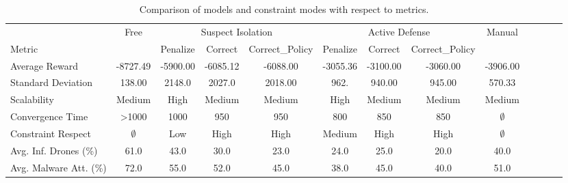 \documentclass[conference]{IEEEtran}
\begin{document}
\begin{table}[t]
    \centering
    \setlength{\tabcolsep}{4.5pt}
    \caption{Comparison of models and constraint modes with respect to metrics.}
    \label{tab:metrics_comparison}
    \begin{tabular}{lcccccccccccc}
                               & {Free}      & \multicolumn{3}{c}{Suspect Isolation} & \multicolumn{3}{c}{Active Defense} & {Manual}                                                              \\
        Metric                 &             & Penalize                              & Correct                            & Correct\_Policy & Penalize & Correct  & Correct\_Policy &             \\
        \midrule
        Average Reward         & -8727.49    & -5900.00                              & -6085.12                           & -6088.00        & -3055.36 & -3100.00 & -3060.00        & -3906.00    \\
        Standard Deviation     & 138.00      & 2148.0                                & 2027.0                             & 2018.00         & 962.     & 940.00   & 945.00          & 570.33      \\
        Scalability            & Medium      & High                                  & Medium                             & Medium          & High     & Medium   & Medium          & Medium      \\
        Convergence Time       & >1000       & 1000                                  & 950                                & 950             & 800      & 850      & 850             & $\emptyset$ \\
        Constraint Respect     & $\emptyset$ & Low                                   & High                               & High            & Medium   & High     & High            & $\emptyset$ \\
        Avg. Inf. Drones (\%)  & 61.0        & 43.0                                  & 30.0                               & 23.0            & 24.0     & 25.0     & 20.0            & 40.0        \\
        Avg. Malware Att. (\%) & 72.0        & 55.0                                  & 52.0                               & 45.0            & 38.0     & 45.0     & 40.0            & 51.0        \\
    \end{tabular}
\end{table}
\end{document}
